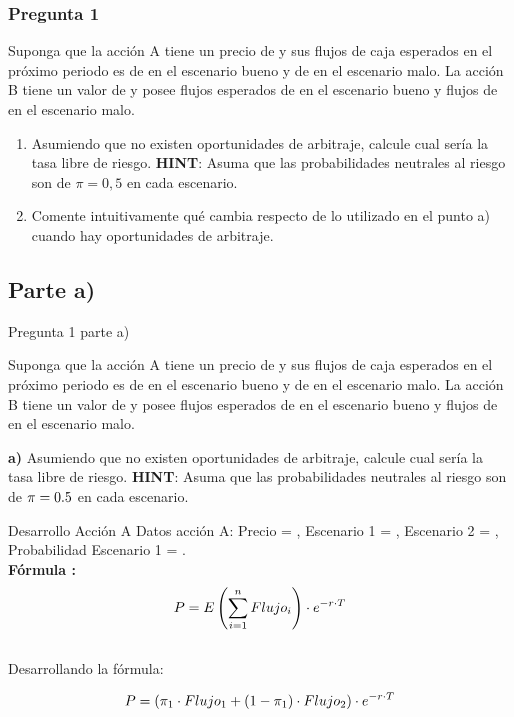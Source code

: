 \documentclass{beamer}
\newif\ifpresentacion
\newcommand{\pausa}{\ifpresentacion\pause\fi}
\begin{document}

\begin{frame}
  \frametitle{Pregunta 1}
    Suponga que la acción A tiene un precio de \dinero{\PaccionA} y sus flujos de caja esperados en el próximo periodo 
    es de \dinero{\FlujobuenoA} en el escenario bueno y de \dinero{\FlujomaloA} en el escenario malo. La acción B tiene un valor de 
    \dinero{\PaccionB} y posee flujos esperados de \dinero{\FlujobuenoB} en el escenario bueno y flujos de \dinero{\FlujomaloB} en el escenario malo. 
    
    \vspace{1em}

    \begin{enumerate}[label=\textbf{\alph*)}]
    \item   Asumiendo que no existen oportunidades de arbitraje, calcule cual sería la tasa libre de riesgo.
    \textbf{HINT}: Asuma que las probabilidades neutrales al riesgo son de $\pi=0,5$ en cada escenario. 
    
    \item   Comente intuitivamente qué cambia respecto de lo utilizado en el punto a) cuando hay oportunidades de arbitraje. 
    
    \end{enumerate}
\end{frame}

\subsection{Parte a)}
\begin{frame}{Pregunta 1 parte a)}
\justify

  Suponga que la acción A tiene un precio de \dinero{\PaccionA} y sus flujos de caja esperados en el próximo periodo 
  es de \dinero{\FlujobuenoA} en el escenario bueno y de \dinero{\FlujomaloA} en el escenario malo. La acción B tiene un valor de 
  \dinero{\PaccionB} y posee flujos esperados de \dinero{\FlujobuenoB} en el escenario bueno y flujos de \dinero{\FlujomaloB} en el escenario malo. \\
  \vspace{1em}

  \textbf{a)}   Asumiendo que no existen oportunidades de arbitraje, calcule cual sería la tasa libre de riesgo.
  \textbf{HINT}: Asuma que las probabilidades neutrales al riesgo son de $\pi=0.5$ en cada escenario.\\

\end{frame}
\begin{frame}{Desarrollo Acción A}
  Datos acción A: Precio = \dinero{\PaccionA}, Escenario 1 = \dinero{\FlujobuenoA}, Escenario 2 = \dinero{\FlujomaloA}, Probabilidad Escenario 1 = \probescenarioA.\\
  \pausa
  \textbf{Fórmula :} \textcolor{blue}{\[P = E \left(\sum_{i=1}^{n} Flujo_i \right) \cdot{e^{-r \cdot T}}\]}  \\
  \pausa
  Desarrollando la fórmula:
  \pausa
  \[P = \left( \pi_1 \cdot Flujo_1 + \left(1-\pi_1\right) \cdot Flujo_2 \right) \cdot{e^{-r \cdot T}}\]\\
\end{frame}
\end{document}
